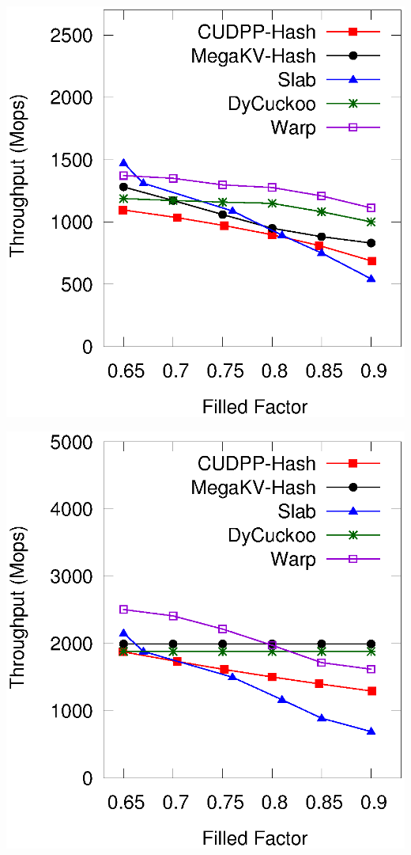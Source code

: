 \begin{minipage}{\textwidth}
	\begin{minipage}[b]{0.49\textwidth}\centering
		\begin{minipage}{0.49\textwidth}\centering
			\includegraphics[width=\textwidth]{../pic/static-load_factor/twitter/insert.eps}
			\centerline{}
		\end{minipage}
		\begin{minipage}{0.49\textwidth}\centering
			\includegraphics[width=\textwidth]{../pic/static-load_factor/twitter/search.eps}

\end{minipage}
\end{minipage}
\end{minipage}
